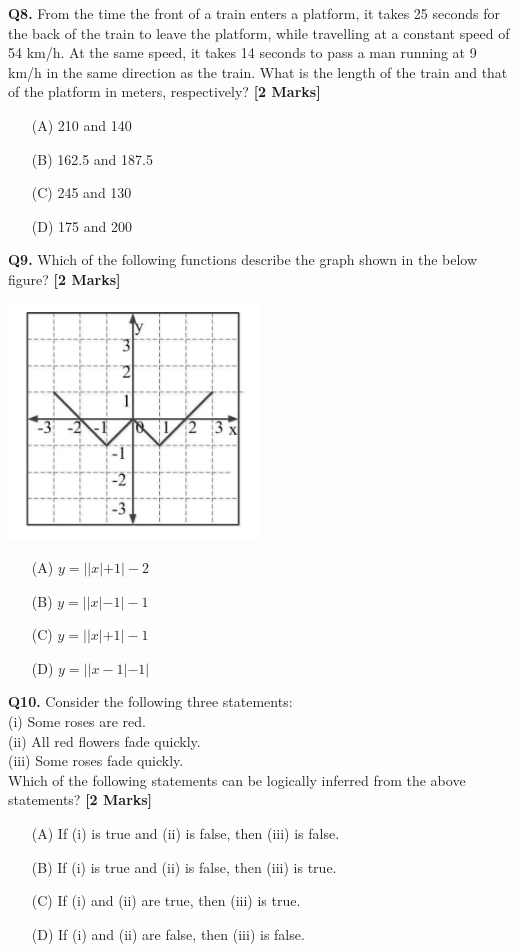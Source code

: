 \documentclass[11pt]{article}
\newcommand{\questionb}[2]{
    \noindent\textbf{Q#2.} #1 \hfill \textbf{[2 Marks]}
}
\begin{document}
\questionb{From the time the front of a train enters a platform, it takes 25 seconds for the back of the train to leave the platform, while travelling at a constant speed of 54 km/h. At the same speed, it takes 14 seconds to pass a man running at 9 km/h in the same direction as the train. What is the length of the train and that of the platform in meters, respectively?}{8}
\begin{enumerate}
    \item[(A)] 210 and 140
    \item[(B)] 162.5 and 187.5
    \item[(C)] 245 and 130
    \item[(D)] 175 and 200
\end{enumerate}
\vspace{0.5cm}

\questionb{Which of the following functions describe the graph shown in the below figure?}{9}

\begin{center}
\includegraphics[width=0.5\textwidth]{figures/9}
\end{center}

\begin{enumerate}
    \item[(A)] \( y = ||x| + 1| - 2 \)
    \item[(B)] \( y = ||x| - 1| - 1 \)
    \item[(C)] \( y = ||x| + 1| - 1 \)
    \item[(D)] \( y = ||x - 1| - 1| \)
\end{enumerate}
\vspace{0.5cm}

\questionb{Consider the following three statements: \\
(i) Some roses are red. \\
(ii) All red flowers fade quickly. \\
(iii) Some roses fade quickly. \\
Which of the following statements can be logically inferred from the above statements?}{10}
\begin{enumerate}
    \item[(A)] If (i) is true and (ii) is false, then (iii) is false.
    \item[(B)] If (i) is true and (ii) is false, then (iii) is true.
    \item[(C)] If (i) and (ii) are true, then (iii) is true.
    \item[(D)] If (i) and (ii) are false, then (iii) is false.
\end{enumerate}
\vspace{0.5cm}
\end{document}
